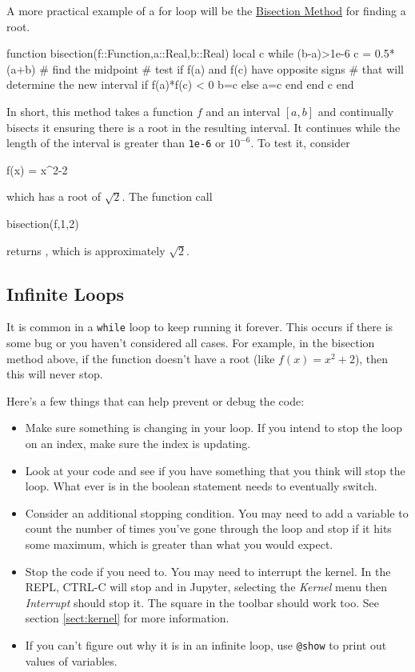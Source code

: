 A more practical example of a for loop will be the \href{https://en.wikipedia.org/wiki/Bisection_method}{Bisection Method} for finding a root.  

\begin{jlblock}[bool]
function bisection(f::Function,a::Real,b::Real)
  local c
  while (b-a)>1e-6
    c = 0.5*(a+b)  # find the midpoint
    # test if f(a) and f(c) have opposite signs
    # that will determine the new interval
    if f(a)*f(c) < 0 
      b=c
    else
      a=c
    end
  end
  c
end
\end{jlblock}

In short, this method takes a function $f$ and an interval $[a,b]$ and continually bisects it ensuring there is a root in the resulting interval.  It continues while the length of the interval is greater than \verb!1e-6! or $10^{-6}$.  To test it, consider
\begin{jlblock}[bool]
f(x) = x^2-2
\end{jlblock}
which has a root of $\sqrt{2}$.  The function call
\begin{jlblock}[bool]
bisection(f,1,2)
\end{jlblock}
returns  \printpythontex[verb], which is approximately $\sqrt{2}$. 

\subsection{Infinite Loops}

It is common in a \texttt{while} loop to keep running it forever. This occurs if there is some bug or you haven't considered all cases.  For example, in the bisection method above, if the function doesn't have a root (like $f(x)=x^2+2$), then this will never stop.  

Here's a few things that can help prevent or debug the code: 
\begin{itemize}
\item Make sure something is changing in your loop. If you intend to stop the loop on an index, make sure the index is updating.
\item Look at your code and see if you have something that you think will stop the loop. What ever is in the boolean statement needs to eventually switch.
\item Consider an additional stopping condition.  You may need to add a variable to count the number of times you've gone through the loop and stop if it hits some maximum, which is greater than what you would expect.  
\item Stop the code if you need to. You may need to interrupt the kernel.  In the REPL, CTRL-C will stop and in Jupyter, selecting the \emph{Kernel} menu then \emph{Interrupt} should stop it.  The square in the toolbar should work too.  See section \ref{sect:kernel} for more information. 
\item If you can't figure out why it is in an infinite loop, use \verb!@show! to print out values of variables.
\end{itemize}

